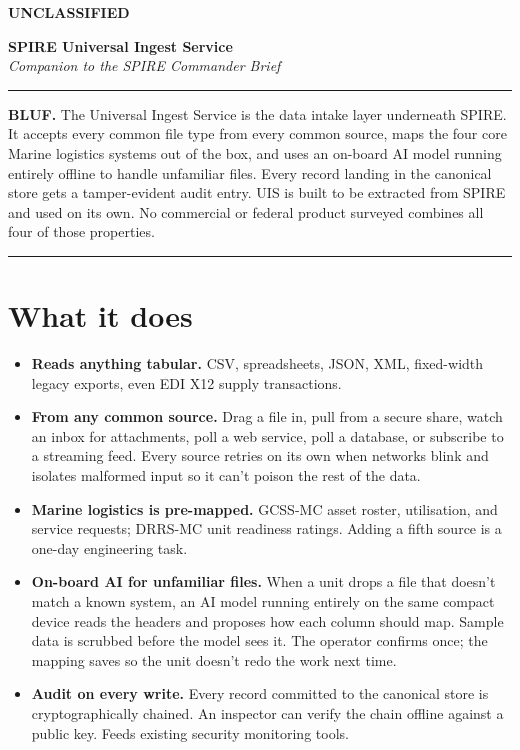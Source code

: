 \documentclass[10pt]{extarticle}
\newcommand{\classband}[0]{%
  \begin{center}\textbf{UNCLASSIFIED}\end{center}%
}
\begin{document}
\justifying

\classband

\vspace{4pt}
\begin{center}
  {\fontsize{20pt}{22pt}\selectfont\bfseries SPIRE Universal Ingest Service}\\[2pt]
  {\fontsize{10.5pt}{12pt}\selectfont\itshape Companion to the SPIRE Commander Brief}
\end{center}

\vspace{-2pt}
\noindent\rule{\linewidth}{0.4pt}

\vspace{2pt}
\noindent\textbf{BLUF.} The Universal Ingest Service is the data intake
layer underneath SPIRE. It accepts every common file type from every
common source, maps the four core Marine logistics systems out of the
box, and uses an on-board AI model running entirely offline to handle
unfamiliar files. Every record landing in the canonical store gets a
tamper-evident audit entry. UIS is built to be extracted from SPIRE
and used on its own. No commercial or federal product surveyed combines
all four of those properties.

\vspace{-2pt}
\noindent\rule{\linewidth}{0.4pt}

\section*{What it does}
\begin{itemize}
  \item \textbf{Reads anything tabular.} CSV, spreadsheets, JSON, XML,
    fixed-width legacy exports, even EDI X12 supply transactions.
  \item \textbf{From any common source.} Drag a file in, pull from a
    secure share, watch an inbox for attachments, poll a web service,
    poll a database, or subscribe to a streaming feed. Every source
    retries on its own when networks blink and isolates malformed input
    so it can't poison the rest of the data.
  \item \textbf{Marine logistics is pre-mapped.} GCSS-MC asset roster,
    utilisation, and service requests; DRRS-MC unit readiness ratings.
    Adding a fifth source is a one-day engineering task.
  \item \textbf{On-board AI for unfamiliar files.} When a unit drops a
    file that doesn't match a known system, an AI model running entirely
    on the same compact device reads the headers and proposes how each column
    should map. Sample data is scrubbed before the model sees it. The
    operator confirms once; the mapping saves so the unit doesn't redo
    the work next time.
  \item \textbf{Audit on every write.} Every record committed to the
    canonical store is cryptographically chained. An inspector can
    verify the chain offline against a public key. Feeds existing
    security monitoring tools.
\end{itemize}
\end{document}
